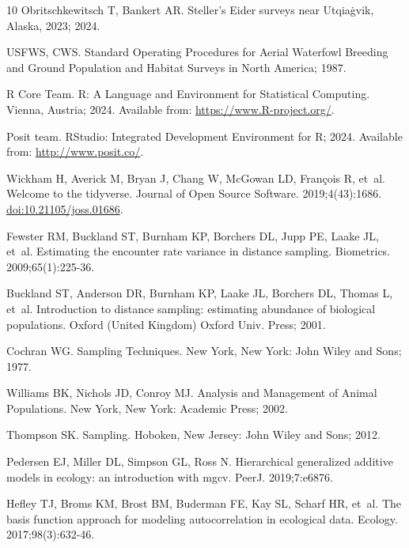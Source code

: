 \documentclass[
  10pt,
  letterpaper,
]{article}
\begin{document}
\begin{thebibliography}{10}
Obritschkewitsch T, Bankert AR.
\newblock Steller's Eider surveys near Utqiaġvik, Alaska, 2023; 2024.

USFWS, CWS.
\newblock Standard Operating Procedures for Aerial Waterfowl Breeding and Ground Population and Habitat Surveys in North America; 1987.

{R Core Team}. R: A Language and Environment for Statistical Computing. Vienna, Austria; 2024.
\newblock Available from: \url{https://www.R-project.org/}.

{Posit team}. RStudio: Integrated Development Environment for R; 2024.
\newblock Available from: \url{http://www.posit.co/}.

Wickham H, Averick M, Bryan J, Chang W, McGowan LD, François R, et~al.
\newblock Welcome to the {tidyverse}.
\newblock Journal of Open Source Software. 2019;4(43):1686.
\newblock \href {http://dx.doi.org/10.21105/joss.01686} {doi:10.21105/joss.01686}.

Fewster RM, Buckland ST, Burnham KP, Borchers DL, Jupp PE, Laake JL, et~al.
\newblock Estimating the encounter rate variance in distance sampling.
\newblock Biometrics. 2009;65(1):225-36.

Buckland ST, Anderson DR, Burnham KP, Laake JL, Borchers DL, Thomas L, et~al.
\newblock Introduction to distance sampling: estimating abundance of biological populations.
\newblock Oxford (United Kingdom) Oxford Univ. Press; 2001.

Cochran WG.
\newblock Sampling Techniques.
\newblock New York, New York: John Wiley and Sons; 1977.

Williams BK, Nichols JD, Conroy MJ.
\newblock Analysis and Management of Animal Populations.
\newblock New York, New York: Academic Press; 2002.

Thompson SK.
\newblock Sampling.
\newblock Hoboken, New Jersey: John Wiley and Sons; 2012.

Pedersen EJ, Miller DL, Simpson GL, Ross N.
\newblock Hierarchical generalized additive models in ecology: an introduction with mgcv.
\newblock PeerJ. 2019;7:e6876.

Hefley TJ, Broms KM, Brost BM, Buderman FE, Kay SL, Scharf HR, et~al.
\newblock The basis function approach for modeling autocorrelation in ecological data.
\newblock Ecology. 2017;98(3):632-46.


\end{thebibliography}
\end{document}
